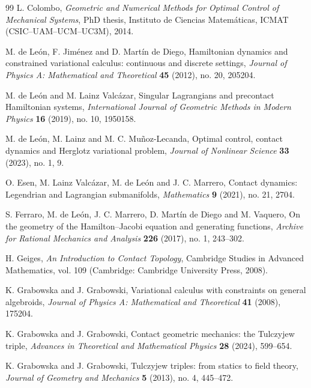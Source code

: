 \documentclass[11pt]{article}
\begin{document}
\begin{thebibliography}{99}
L. Colombo,
\textit{Geometric and Numerical Methods for Optimal Control of Mechanical Systems},
PhD thesis, Instituto de Ciencias Matem\'aticas, ICMAT (CSIC--UAM--UCM--UC3M), 2014.

M. de Le\'on, F. Jim\'enez and D. Mart\'in de Diego,
Hamiltonian dynamics and constrained variational calculus: continuous and discrete settings,
\textit{Journal of Physics A: Mathematical and Theoretical}
\textbf{45} (2012), no. 20, 205204.

M. de Le\'on and M. Lainz Valc\'azar,
Singular Lagrangians and precontact Hamiltonian systems,
\textit{International Journal of Geometric Methods in Modern Physics}
\textbf{16} (2019), no. 10, 1950158.

M. de Le\'on, M. Lainz and M. C. Mu\~noz-Lecanda,
Optimal control, contact dynamics and Herglotz variational problem,
\textit{Journal of Nonlinear Science}
\textbf{33} (2023), no. 1, 9.

O. Esen, M. Lainz Valc\'azar, M. de Le\'on and J. C. Marrero,
Contact dynamics: Legendrian and Lagrangian submanifolds,
\textit{Mathematics}
\textbf{9} (2021), no. 21, 2704.

S. Ferraro, M. de Le\'on, J. C. Marrero, D. Mart\'in de Diego and M. Vaquero,
On the geometry of the Hamilton--Jacobi equation and generating functions,
\textit{Archive for Rational Mechanics and Analysis}
\textbf{226} (2017), no. 1, 243--302.

H. Geiges,
\textit{An Introduction to Contact Topology},
Cambridge Studies in Advanced Mathematics, vol. 109 (Cambridge: Cambridge University Press, 2008).

K. Grabowska and J. Grabowski,
Variational calculus with constraints on general algebroids,
\textit{Journal of Physics A: Mathematical and Theoretical}
\textbf{41} (2008), 175204.

K. Grabowska and J. Grabowski,
Contact geometric mechanics: the Tulczyjew triple,
\textit{Advances in Theoretical and Mathematical Physics}
\textbf{28} (2024), 599--654.

K. Grabowska and J. Grabowski,
Tulczyjew triples: from statics to field theory,
\textit{Journal of Geometry and Mechanics}
\textbf{5} (2013), no. 4, 445--472.


\end{thebibliography}
\end{document}
